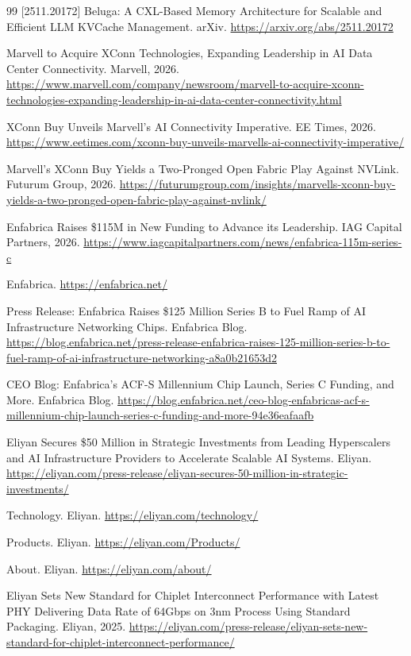 \begin{thebibliography}{99}
 [2511.20172] Beluga: A CXL-Based Memory Architecture for Scalable and Efficient LLM KVCache Management. arXiv. \url{https://arxiv.org/abs/2511.20172}

 Marvell to Acquire XConn Technologies, Expanding Leadership in AI Data Center Connectivity. Marvell, 2026. \url{https://www.marvell.com/company/newsroom/marvell-to-acquire-xconn-technologies-expanding-leadership-in-ai-data-center-connectivity.html}

 XConn Buy Unveils Marvell's AI Connectivity Imperative. EE Times, 2026. \url{https://www.eetimes.com/xconn-buy-unveils-marvells-ai-connectivity-imperative/}

 Marvell's XConn Buy Yields a Two-Pronged Open Fabric Play Against NVLink. Futurum Group, 2026. \url{https://futurumgroup.com/insights/marvells-xconn-buy-yields-a-two-pronged-open-fabric-play-against-nvlink/}

 Enfabrica Raises \$115M in New Funding to Advance its Leadership. IAG Capital Partners, 2026. \url{https://www.iagcapitalpartners.com/news/enfabrica-115m-series-c}

 Enfabrica. \url{https://enfabrica.net/}

 Press Release: Enfabrica Raises \$125 Million Series B to Fuel Ramp of AI Infrastructure Networking Chips. Enfabrica Blog. \url{https://blog.enfabrica.net/press-release-enfabrica-raises-125-million-series-b-to-fuel-ramp-of-ai-infrastructure-networking-a8a0b21653d2}

 CEO Blog: Enfabrica's ACF-S Millennium Chip Launch, Series C Funding, and More. Enfabrica Blog. \url{https://blog.enfabrica.net/ceo-blog-enfabricas-acf-s-millennium-chip-launch-series-c-funding-and-more-94e36eafaafb}

 Eliyan Secures \$50 Million in Strategic Investments from Leading Hyperscalers and AI Infrastructure Providers to Accelerate Scalable AI Systems. Eliyan. \url{https://eliyan.com/press-release/eliyan-secures-50-million-in-strategic-investments/}

 Technology. Eliyan. \url{https://eliyan.com/technology/}

 Products. Eliyan. \url{https://eliyan.com/Products/}

 About. Eliyan. \url{https://eliyan.com/about/}

 Eliyan Sets New Standard for Chiplet Interconnect Performance with Latest PHY Delivering Data Rate of 64Gbps on 3nm Process Using Standard Packaging. Eliyan, 2025. \url{https://eliyan.com/press-release/eliyan-sets-new-standard-for-chiplet-interconnect-performance/}


\end{thebibliography}
